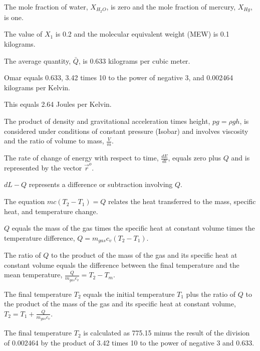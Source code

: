 The mole fraction of water, \(X_{H_2O}\), is zero and the mole fraction of mercury, \(X_{Hg}\), is one.

The value of \(X_1\) is 0.2 and the molecular equivalent weight (MEW) is 0.1 kilograms.

The average quantity, \(\bar{Q}\), is 0.633 kilograms per cubic meter.

Omar equals 0.633, 3.42 times 10 to the power of negative 3, and 0.002464 kilograms per Kelvin.

This equals 2.64 Joules per Kelvin.

The product of density and gravitational acceleration times height, \(p g = \rho g h\), is considered under conditions of constant pressure (Isobar) and involves viscosity and the ratio of volume to mass, \(\frac{V}{m}\).

The rate of change of energy with respect to time, \(\frac{dE}{dt}\), equals zero plus \(Q\) and is represented by the vector \(\vec{r}^o\).

\(dL - Q\) represents a difference or subtraction involving \(Q\).

The equation \(m c (T_2 - T_1) = Q\) relates the heat transferred to the mass, specific heat, and temperature change.

\(Q\) equals the mass of the gas times the specific heat at constant volume times the temperature difference, \(Q = m_{gas} c_v (T_2 - T_1)\).

The ratio of \(Q\) to the product of the mass of the gas and its specific heat at constant volume equals the difference between the final temperature and the mean temperature, \(\frac{Q}{m_{gas} c_v} = T_2 - T_m\).

The final temperature \(T_2\) equals the initial temperature \(T_1\) plus the ratio of \(Q\) to the product of the mass of the gas and its specific heat at constant volume, \(T_2 = T_1 + \frac{Q}{m_{gas} c_v}\).

The final temperature \(T_2\) is calculated as 775.15 minus the result of the division of 0.002464 by the product of 3.42 times 10 to the power of negative 3 and 0.633.
